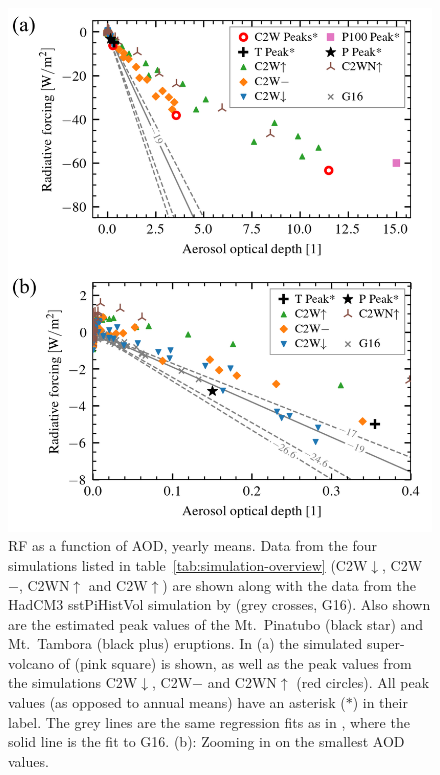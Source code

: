 \documentclass[draft]{agujournal2019}
\newcommand{\cwmp}{C2W\(-\)}
\newcommand{\cwm}{C2W\(\downarrow\)}
\newcommand{\cws}{C2WN\(\uparrow\)}
\newcommand{\cwsn}{C2W\(\uparrow\)}
\begin{document}
\begin{figure}
  \centering
  \includegraphics{figures/figure2.png}

  \caption{RF as a function of AOD, yearly means. Data from the four
    simulations listed in table~\ref{tab:simulation-overview} (\cwm{}, \cwmp{},
    \cws{} and \cwsn{}) are shown along with the data from the HadCM3 sstPiHistVol
    simulation by  (grey crosses, G16). Also shown are the estimated peak
    values of the Mt.\ Pinatubo (black star) and Mt.\ Tambora (black plus) eruptions. In (a)
    the simulated super-volcano of  (pink square) is shown, as well as the
    peak values from the simulations \cwm{}, \cwmp{} and \cws{} (red circles).
    All peak values (as opposed to annual means) have an asterisk (\(\ast{}\)) in their
    label. The grey lines are the same regression fits as in ,
    where the solid line is the fit to G16. (b): Zooming
    in on the smallest AOD values.}\label{fig:aod_vs_toa_ses_avg}%
\end{figure}
\end{document}
